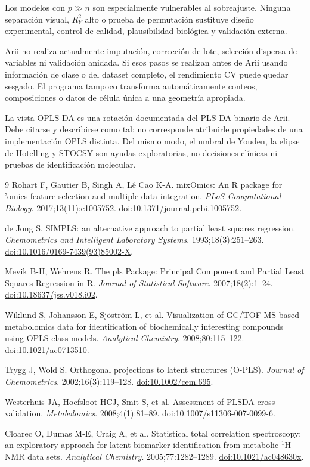 \documentclass[11pt,a4paper,openany]{report}
\newcommand{\RtwoY}{R^{2}_{Y}}
\begin{document}
Los modelos con $p\gg n$ son especialmente vulnerables al sobreajuste. Ninguna separación visual, $\RtwoY$ alto o prueba de permutación sustituye diseño experimental, control de calidad, plausibilidad biológica y validación externa.

Arii no realiza actualmente imputación, corrección de lote, selección dispersa de variables ni validación anidada. Si esos pasos se realizan antes de Arii usando información de clase o del dataset completo, el rendimiento CV puede quedar sesgado. El programa tampoco transforma automáticamente conteos, composiciones o datos de célula única a una geometría apropiada.

La vista OPLS-DA es una rotación documentada del PLS-DA binario de Arii. Debe citarse y describirse como tal; no corresponde atribuirle propiedades de una implementación OPLS distinta. Del mismo modo, el umbral de Youden, la elipse de Hotelling y STOCSY son ayudas exploratorias, no decisiones clínicas ni pruebas de identificación molecular.

\begin{thebibliography}{9}
 Rohart F, Gautier B, Singh A, Lê Cao K-A.
mixOmics: An R package for 'omics feature selection and multiple data integration.
\emph{PLoS Computational Biology}. 2017;13(11):e1005752.
\href{https://doi.org/10.1371/journal.pcbi.1005752}{doi:10.1371/journal.pcbi.1005752}.

 de Jong S.
SIMPLS: an alternative approach to partial least squares regression.
\emph{Chemometrics and Intelligent Laboratory Systems}. 1993;18(3):251--263.
\href{https://doi.org/10.1016/0169-7439(93)85002-X}{doi:10.1016/0169-7439(93)85002-X}.

 Mevik B-H, Wehrens R.
The pls Package: Principal Component and Partial Least Squares Regression in R.
\emph{Journal of Statistical Software}. 2007;18(2):1--24.
\href{https://doi.org/10.18637/jss.v018.i02}{doi:10.18637/jss.v018.i02}.

 Wiklund S, Johansson E, Sjöström L, et al.
Visualization of GC/TOF-MS-based metabolomics data for identification of
biochemically interesting compounds using OPLS class models.
\emph{Analytical Chemistry}. 2008;80:115--122.
\href{https://doi.org/10.1021/ac0713510}{doi:10.1021/ac0713510}.

 Trygg J, Wold S.
Orthogonal projections to latent structures (O-PLS).
\emph{Journal of Chemometrics}. 2002;16(3):119--128.
\href{https://doi.org/10.1002/cem.695}{doi:10.1002/cem.695}.

 Westerhuis JA, Hoefsloot HCJ, Smit S, et al.
Assessment of PLSDA cross validation.
\emph{Metabolomics}. 2008;4(1):81--89.
\href{https://doi.org/10.1007/s11306-007-0099-6}{doi:10.1007/s11306-007-0099-6}.

 Cloarec O, Dumas M-E, Craig A, et al.
Statistical total correlation spectroscopy: an exploratory approach for latent
biomarker identification from metabolic $^1$H NMR data sets.
\emph{Analytical Chemistry}. 2005;77:1282--1289.
\href{https://doi.org/10.1021/ac048630x}{doi:10.1021/ac048630x}.
\end{thebibliography}
\end{document}

